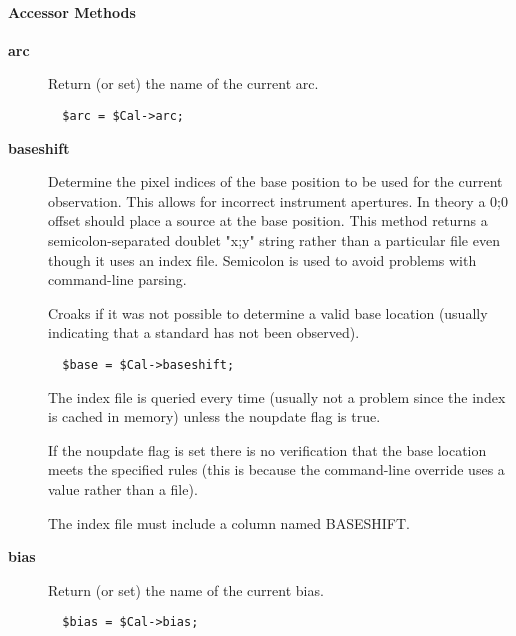 \paragraph*{Accessor Methods\label{ORAC::Calib_Accessor_Methods}}
\begin{description}

\item[{\textbf{arc}}] \mbox{}

Return (or set) the name of the current arc.

\begin{verbatim}
  $arc = $Cal->arc;
\end{verbatim}

\item[{\textbf{baseshift}}] \mbox{}

Determine the pixel indices of the base position to be used for the
current observation.  This allows for incorrect instrument apertures.
In theory a 0;0 offset should place a source at the base position.
This method returns a semicolon-separated doublet "x;y" string rather
than a particular file even though it uses an index file.  Semicolon
is used to avoid problems with command-line parsing.



Croaks if it was not possible to determine a valid base location
(usually indicating that a standard has not been observed).

\begin{verbatim}
  $base = $Cal->baseshift;
\end{verbatim}


The index file is queried every time (usually not a problem since the
index is cached in memory) unless the noupdate flag is true.



If the noupdate flag is set there is no verification that the base
location meets the specified rules (this is because the command-line
override uses a value rather than a file).



The index file must include a column named BASESHIFT.


\item[{\textbf{bias}}] \mbox{}

Return (or set) the name of the current bias.

\begin{verbatim}
  $bias = $Cal->bias;
\end{verbatim}


\end{description}
